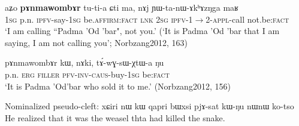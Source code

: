 \documentclass[oneside,a4paper,11pt]{article}
\newcommand{\fl}{$\rightarrow$}
\begin{document}
\begin{exe}
\ex \label{ex:tutia.ɕti}
\gll aʑo \textbf{pɤnmawombɤr} tu-ti-a ɕti ma, nɤj ɲɯ-ta-nɯ-ɤkʰɤzŋga maʁ  \\
\textsc{1sg} p.n. \textsc{ipfv}-say-\textsc{1sg} be.\textsc{affirm}:\textsc{fact} \textsc{lnk} \textsc{2sg} \textsc{ipfv}-1\fl{}2-\textsc{appl}-call not.be:\textsc{fact} \\
\glt `I am calling ``Padma 'Od 'bar", not you.' (`It is Padma 'Od 'bar that I am saying, I am not calling you'; Norbzang2012, 163)
\end{exe}

\begin{exe}
\ex \label{ex:tAwGsWXtWa}
\gll pɤnmawombɤr kɯ, nɤki, tɤ́-wɣ-sɯ-χtɯ-a ŋu \\
p.n. \textsc{erg} \textsc{filler} \textsc{pfv}-\textsc{inv}-\textsc{caus}-buy-\textsc{1sg} be:\textsc{fact} \\
\glt `It is Padma 'Od'bar who sold it to me.' (Norbzang2012, 156)
\end{exe}

Nominalized pseudo-cleft:
xɕiri nɯ kɯ qapri bɯxsi pjɤ-sat kɯ-ŋu nɯnɯ ko-tso
He realized that it was the weasel thta had killed the snake.
\end{document}
